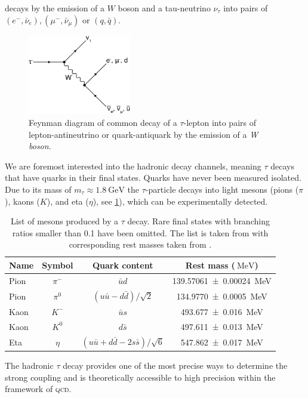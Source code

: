 \documentclass[../../index.tex]{subfiles}
\begin{document}
decays by the emission of a \(W\) boson and a tau-neutrino \(\nu_\tau\) into
pairs of \((e^-, \bar\nu_e), (\mu^-, \bar\nu_\mu)\) or \((q, \bar q)\).
\begin{figure}
  \centering \includegraphics[width=0.4\textwidth]{images/tauDecay.eps}
  \caption{Feynman diagram of common decay of a \(\tau\)-lepton into pairs of
    lepton-antineutrino or quark-antiquark by the emission of a \textit{W
      boson}.}
  \label{fig:tauDecay}
\end{figure}
We are foremost interested into the hadronic decay channels, meaning \(\tau\)
decays that have quarks in their final states. Quarks have never been measured
isolated. Due to its mass of \(m_\tau \approx \SI{1.8}{\giga\electronvolt}\) the
\(\tau\)-particle decays into light mesons (pions (\(\pi\)), kaons (\(K\)), and
eta (\(\eta\)), see \cref{table:lightMesons}), which can be experimentally
detected.
\begin{table}
  \centering
  \begin{tabular}{lccc}
    \toprule
    Name & Symbol & Quark content & Rest mass (\(\SI{}{\mega\electronvolt}\)) \\
    \midrule
    Pion & \(\pi^-\) & \(\bar u d\) & \SI{139.57061 \pm 0.00024}{\mega\electronvolt}  \\
    Pion & \(\pi^0\) & \((u \bar u - d \bar d)/\sqrt{2}\) & \SI{134.9770\pm0.0005}{\mega\electronvolt} \\
    Kaon & \(K^-\) & \(\bar u s\) & \SI{493.677\pm0.016}{\mega\electronvolt} \\
    Kaon & \(K^0\) & \(d \bar s\) & \SI{497.611\pm0.013}{\mega\electronvolt} \\
    Eta & \(\eta\) & \((u \bar u + d \bar d - 2 s \bar s)/\sqrt{6}\) & \SI{547.862\pm0.017}{\mega\electronvolt} \\
  \end{tabular}
  \caption{List of mesons produced by a \(\tau\) decay. Rare final states with
    branching ratios smaller than 0.1 have been omitted. The list is taken from
    \cite{Davier2006} with corresponding rest masses taken from \cite{PDG2018}.}
  \label{table:lightMesons}
\end{table}
The hadronic \(\tau\) decay provides one of the most precise ways to determine
the strong coupling \cite{Pich2016} and is theoretically accessible to high
precision within the framework of \textsc{qcd}.
\end{document}
